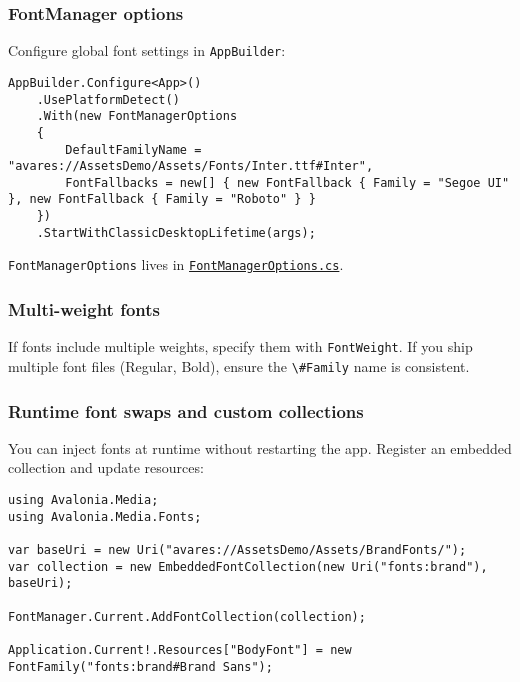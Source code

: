 \subsubsection{FontManager options}\label{fontmanager-options}

Configure global font settings in \passthrough{\lstinline!AppBuilder!}:

\begin{lstlisting}
AppBuilder.Configure<App>()
    .UsePlatformDetect()
    .With(new FontManagerOptions
    {
        DefaultFamilyName = "avares://AssetsDemo/Assets/Fonts/Inter.ttf#Inter",
        FontFallbacks = new[] { new FontFallback { Family = "Segoe UI" }, new FontFallback { Family = "Roboto" } }
    })
    .StartWithClassicDesktopLifetime(args);
\end{lstlisting}

\passthrough{\lstinline!FontManagerOptions!} lives in
\href{https://github.com/AvaloniaUI/Avalonia/blob/master/src/Avalonia.Base/Media/FontManagerOptions.cs}{\passthrough{\lstinline!FontManagerOptions.cs!}}.

\subsubsection{Multi-weight fonts}\label{multi-weight-fonts}

If fonts include multiple weights, specify them with
\passthrough{\lstinline!FontWeight!}. If you ship multiple font files
(Regular, Bold), ensure the \passthrough{\lstinline!\#Family!} name is
consistent.

\subsubsection{Runtime font swaps and custom
collections}\label{runtime-font-swaps-and-custom-collections}

You can inject fonts at runtime without restarting the app. Register an
embedded collection and update resources:

\begin{lstlisting}
using Avalonia.Media;
using Avalonia.Media.Fonts;

var baseUri = new Uri("avares://AssetsDemo/Assets/BrandFonts/");
var collection = new EmbeddedFontCollection(new Uri("fonts:brand"), baseUri);

FontManager.Current.AddFontCollection(collection);

Application.Current!.Resources["BodyFont"] = new FontFamily("fonts:brand#Brand Sans");
\end{lstlisting}

